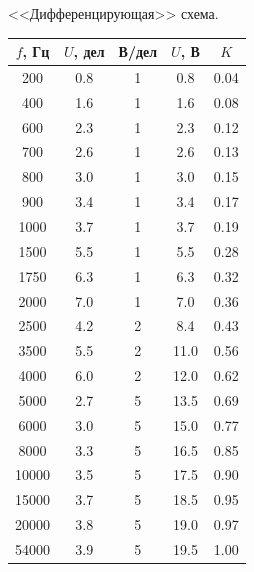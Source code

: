\documentclass[14pt]{article}
\begin{document}
<<Дифференцирующая>> схема.

\begin{center}
\begin{tabular}{|c|c|c|c|c|}
\hline
$f$, Гц		&	$U$, дел	&	В/дел	&	$U$, В	&	$K$\\
\hline
200			&	0.8			&	1		&	0.8		&	0.04\\
\hline
400			&	1.6			&	1		&	1.6		&	0.08\\
\hline
600			&	2.3			&	1		&	2.3		&	0.12\\
\hline
700			&	2.6			&	1		&	2.6		&	0.13\\
\hline
800			&	3.0			&	1		&	3.0		&	0.15\\
\hline
900			&	3.4			&	1		&	3.4		&	0.17\\
\hline
1000		&	3.7			&	1		&	3.7		&	0.19\\
\hline
1500		&	5.5			&	1		&	5.5		&	0.28\\
\hline
1750		&	6.3			&	1		&	6.3		&	0.32\\
\hline
2000		&	7.0			&	1		&	7.0		&	0.36\\
\hline
2500		&	4.2			&	2		&	8.4		&	0.43\\
\hline
3500		&	5.5			&	2		&	11.0	&	0.56\\
\hline
4000		&	6.0			&	2		&	12.0	&	0.62\\
\hline
5000		&	2.7			&	5		&	13.5	&	0.69\\
\hline
6000		&	3.0			&	5		&	15.0	&	0.77\\
\hline
8000		&	3.3			&	5		&	16.5	&	0.85\\
\hline
10000		&	3.5			&	5		&	17.5	&	0.90\\
\hline
15000		&	3.7			&	5		&	18.5	&	0.95\\
\hline
20000		&	3.8			&	5		&	19.0	&	0.97\\
\hline
54000		&	3.9			&	5		&	19.5	&	1.00\\
\hline
\end{tabular}
\end{center}

\vspace{0.5cm}
\begin{center}
\end{center}
\end{document}
